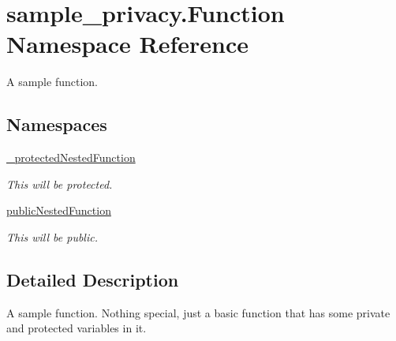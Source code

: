 \hypertarget{namespacesample__privacy_1_1_function}{\section{sample\-\_\-privacy.\-Function Namespace Reference}
\label{namespacesample__privacy_1_1_function}
}


A sample function.  


\subsection*{Namespaces}
\begin{DoxyCompactItemize}
\item 
\hyperlink{namespacesample__privacy_1_1_function_1_1__protected_nested_function}{\-\_\-protected\-Nested\-Function}
\begin{DoxyCompactList}\small\item\em This will be protected. \end{DoxyCompactList}\item 
\hyperlink{namespacesample__privacy_1_1_function_1_1public_nested_function}{public\-Nested\-Function}
\begin{DoxyCompactList}\small\item\em This will be public. \end{DoxyCompactList}\end{DoxyCompactItemize}


\subsection{Detailed Description}
A sample function. Nothing special, just a basic function that has some private and protected variables in it. 